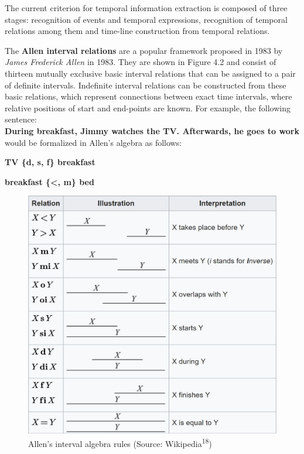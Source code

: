 \documentclass{report}
\begin{document}
The current criterion for temporal information extraction is composed of three stages: recognition of events and temporal expressions, recognition of temporal relations among them and time-line construction from temporal relations. \par

The \textbf{Allen interval relations} are a popular framework proposed in 1983 by \textit{James Frederick Allen} in 1983. They are shown in Figure 4.2 and consist of thirteen mutually exclusive basic interval relations that can be assigned to a pair of definite intervals.
Indefinite interval relations can be constructed from these basic relations, which represent connections between exact time intervals, where relative positions of start and end-points are known. For example, the following sentence:\\

\textbf{During breakfast, Jimmy watches the TV. Afterwards, he goes to work}\\

 would be formalized in Allen's algebra as follows:\\

\centerline{\textbf{TV \{d, s, f\} breakfast}}
\centerline{\textbf{breakfast \{\textless, m\} bed}}

\begin{figure}[b]
\caption{Allen's interval algebra rules (Source: Wikipedia\textsuperscript{18})}
\vspace*{1cm}
\centerline{\includegraphics[scale=1]{allen}}
\end{figure}
\end{document}

